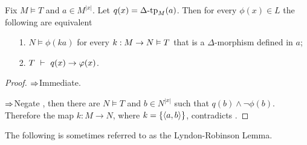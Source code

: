 \begin{proposition}\label{prop_pokj}
Fix $M\models T$ and $a\in M^{|x|}$. Let $q(x)=\Delta\mbox{-}\textrm{tp}_M(a)$. Then for every $\phi(x)\in L$ the following are equivalent
\begin{itemize}
\item[1.] $N\models\phi(ka)$ for every $k:M\rightarrow N\vDash T$ that is a $\Delta$-morphism defined in $a$;
\item[2.] $T\ \proves\  q(x)\imp\phi(x)$.
\end{itemize}
\end{proposition}
\begin{proof}$\Rightarrow$\quad Immediate.  

$\Rightarrow$\quad Negate , then there are $N\models T$ and $b\in N^{|x|}$ such that $q(b)\wedge\neg\phi(b)$. Therefore the map $k:M\to N$, where $k=\{\langle a,b\rangle\}$, contradicts .
\end{proof}

The following is sometimes referred to as the Lyndon-Robinson Lemma.

